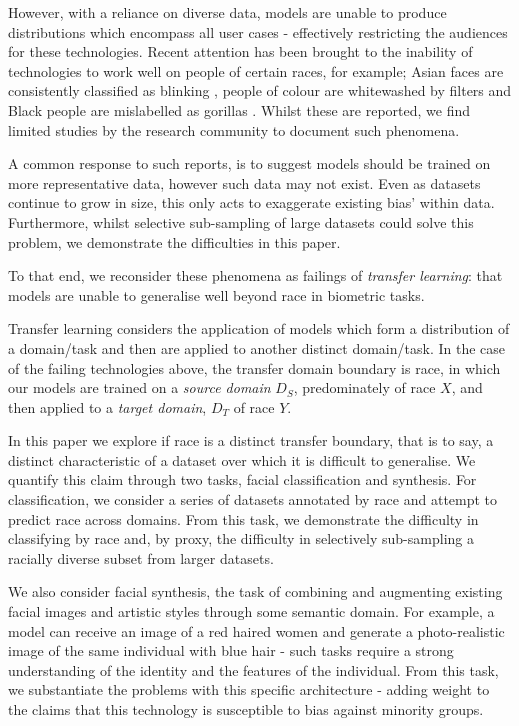 \documentclass[10pt,twocolumn,letterpaper]{article}
\begin{document}
However, with a reliance on diverse data, models are unable to produce distributions which encompass all user cases - effectively restricting the audiences for these technologies. Recent attention has been brought to the inability of technologies to work well on people of certain races, for example; Asian faces are consistently classified as blinking \cite{blinking}, people of colour are whitewashed by filters \cite{white-washed} and Black people are mislabelled as gorillas \cite{buolamwini2018gender}. Whilst these are reported, we find limited studies by the research community to document such phenomena.

A common response to such reports, is to suggest models should be trained on more representative data, however such data may not exist. Even as datasets continue to grow in size, this only acts to exaggerate existing bias' within data. Furthermore, whilst selective sub-sampling of large datasets could solve this problem, we demonstrate the difficulties in this paper.

To that end, we reconsider these phenomena as failings of \textit{transfer learning}: that models are unable to generalise well beyond race in biometric tasks. 

Transfer learning considers the application of models which form a distribution of a domain/task and then are applied to another distinct domain/task. In the case of the failing technologies above, the transfer domain boundary is race, in which our models are trained on a \textit{source domain} $D_{S}$, predominately of race $X$, and then applied to a \textit{target domain}, $D_{T}$ of race $Y$.

In this paper we explore if race is a distinct transfer boundary, that is to say, a distinct characteristic of a dataset over which it is difficult to generalise. We quantify this claim through two tasks, facial classification and synthesis. For classification, we consider a series of datasets annotated by race and attempt to predict race across domains. From this task, we demonstrate the difficulty in classifying by race and, by proxy, the difficulty in selectively sub-sampling a racially diverse subset from larger datasets.

We also consider facial synthesis, the task of combining and augmenting existing facial images and artistic styles through some semantic domain. For example, a model can receive an image of a red haired women and generate a photo-realistic image of the same individual with blue hair - such tasks require a strong understanding of the identity and the features of the individual. From this task, we substantiate the problems with this specific architecture - adding weight to the claims that this technology is susceptible to bias against minority groups. 
\end{document}
